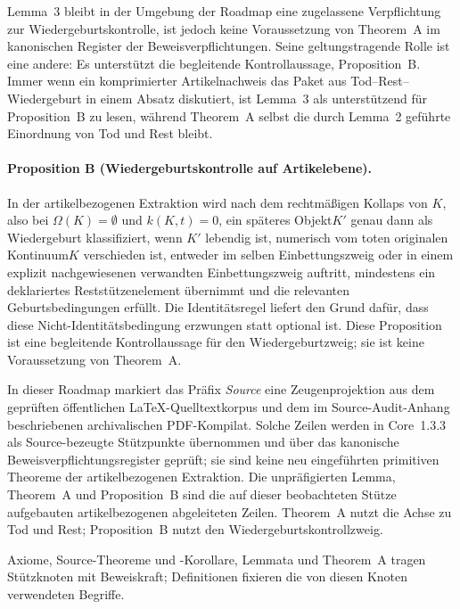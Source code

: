Lemma~3 bleibt in der Umgebung der Roadmap eine zugelassene Verpflichtung zur Wiedergeburtskontrolle,
ist jedoch keine Voraussetzung von Theorem~A im kanonischen Register der Beweisverpflichtungen. Seine
geltungstragende Rolle ist eine andere: Es unterstützt die begleitende Kontrollaussage,
Proposition~B. Immer wenn ein komprimierter Artikelnachweis das Paket aus Tod--Rest--Wiedergeburt
in einem Absatz diskutiert, ist Lemma~3 als unterstützend für Proposition~B zu lesen, während
Theorem~A selbst die durch Lemma~2 geführte Einordnung von Tod und Rest bleibt.

\paragraph{Proposition B (Wiedergeburtskontrolle auf Artikelebene).}
\label{prop:oc13-rebirth-control}
In der artikelbezogenen Extraktion wird nach dem rechtmäßigen Kollaps von
\(K\), also bei \(\Omega(K)=\emptyset\) und \(k(K,t)=0\), ein späteres Objekt\(K'\) genau dann
als Wiedergeburt klassifiziert, wenn \(K'\) lebendig ist, numerisch vom toten originalen Kontinuum\(K\)
verschieden ist, entweder im selben Einbettungszweig oder in einem explizit nachgewiesenen verwandten
Einbettungszweig auftritt, mindestens ein deklariertes Reststützenelement übernimmt und die relevanten
Geburtsbedingungen erfüllt. Die Identitätsregel liefert den Grund dafür, dass diese Nicht-Identitätsbedingung
erzwungen statt optional ist. Diese Proposition ist eine begleitende Kontrollaussage für den Wiedergeburtzweig;
sie ist keine Voraussetzung von Theorem~A.

In dieser Roadmap markiert das Präfix \emph{Source} eine Zeugenprojektion aus dem geprüften öffentlichen
LaTeX-Quelltextkorpus und dem im Source-Audit-Anhang beschriebenen archivalischen PDF-Kompilat.
Solche Zeilen werden in Core~1.3.3 als Source-bezeugte Stützpunkte übernommen und über das
kanonische Beweisverpflichtungsregister geprüft; sie sind keine neu eingeführten primitiven Theoreme der
artikelbezogenen Extraktion. Die unpräfigierten Lemma, Theorem~A und Proposition~B sind die auf dieser
beobachteten Stütze aufgebauten artikelbezogenen abgeleiteten Zeilen. Theorem~A nutzt die Achse zu
Tod und Rest; Proposition~B nutzt den Wiedergeburtskontrollzweig.

Axiome, Source-Theoreme und -Korollare, Lemmata und Theorem~A tragen Stützknoten mit
Beweiskraft; Definitionen fixieren die von diesen Knoten verwendeten Begriffe.

